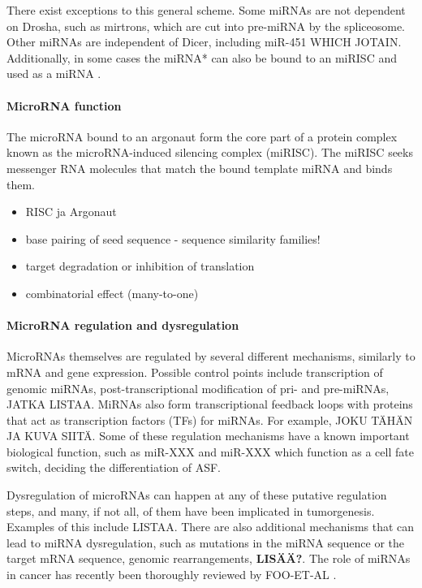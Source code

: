 There exist exceptions to this general scheme. Some miRNAs are not dependent
on Drosha, such as mirtrons, which are cut into pre-miRNA by the spliceosome.
Other miRNAs are independent of Dicer, including miR-451 WHICH JOTAIN.
Additionally, in some cases the miRNA* can also be bound to an miRISC and used
as a miRNA \citep{CITE}.





\paragraph{MicroRNA function}\label{microrna-function}

The microRNA bound to an argonaut form the core part of a protein complex
known as the microRNA-induced silencing complex (miRISC). The miRISC seeks
messenger RNA molecules that match the bound template miRNA and binds them.

\begin{itemize}
\item
  RISC ja Argonaut
\item
  base pairing of seed sequence - sequence similarity families!
\item
  target degradation or inhibition of translation
\item
  combinatorial effect (many-to-one)
\end{itemize}





\paragraph{MicroRNA regulation and dysregulation}\label{microrna-
regulation-and-dysregulation}

MicroRNAs themselves are regulated by several different mechanisms, similarly
to mRNA and gene expression. Possible control points include transcription of
genomic miRNAs, post-transcriptional modification of pri- and pre-miRNAs,
JATKA LISTAA. MiRNAs also form transcriptional feedback loops with proteins
that act as transcription factors (TFs) for miRNAs. For example, JOKU TÄHÄN JA
KUVA SIITÄ. Some of these regulation mechanisms have a known important
biological function, such as miR-XXX and miR-XXX which function as a cell fate
switch, deciding the differentiation of ASF.

Dysregulation of microRNAs can happen at any of these putative regulation
steps, and many, if not all, of them have been implicated in tumorgenesis.
Examples of this include LISTAA. There are also additional mechanisms that can
lead to miRNA dysregulation, such as mutations in the miRNA sequence or the
target mRNA sequence, genomic rearrangements,
\textbf{LISÄÄ?}. The role of miRNAs in cancer has recently been
thoroughly reviewed by FOO-ET-AL \citep{CITE}.

